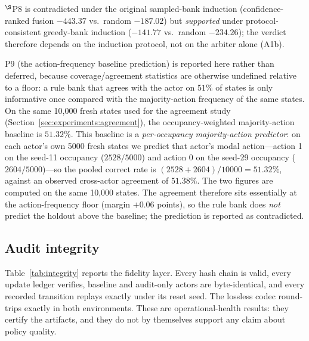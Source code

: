 \documentclass[11pt]{article}
\begin{document}
$^{\S}$P8 is contradicted under the original sampled-bank induction (confidence-ranked fusion $-443.37$
vs.\ random $-187.02$) but \emph{supported} under protocol-consistent greedy-bank induction ($-141.77$
vs.\ random $-234.26$); the verdict therefore depends on the induction protocol, not on the arbiter
alone (A1b).

P9 (the action-frequency baseline prediction) is reported here rather than deferred, because
coverage/agreement statistics are otherwise undefined relative to a floor: a rule bank that agrees
with the actor on $51\%$ of states is only informative once compared with the majority-action
frequency of the same states. On the same 10{,}000 fresh states used for the agreement study
(Section~\ref{sec:experiments:agreement}), the occupancy-weighted majority-action baseline is
$51.32\%$. This baseline is a \emph{per-occupancy majority-action predictor}: on each actor's own
5000 fresh states we predict that actor's modal action---action 1 on the seed-11 occupancy
($2528/5000$) and action 0 on the seed-29 occupancy ($2604/5000$)---so the pooled correct rate is
$(2528+2604)/10000 = 51.32\%$, against an observed cross-actor agreement of $51.38\%$. The two
figures are computed on the same 10{,}000 states. The agreement therefore sits
essentially at the action-frequency floor (margin $+0.06$ points), so the rule bank does \emph{not}
predict the holdout above the baseline; the prediction is reported as contradicted.

\subsection{Audit integrity}
\label{sec:experiments:integrity}

Table~\ref{tab:integrity} reports the fidelity layer. Every hash chain is valid, every update
ledger verifies, baseline and audit-only actors are byte-identical, and every recorded transition
replays exactly under its reset seed. The lossless codec round-trips exactly in both environments.
These are operational-health results: they certify the artifacts, and they do not by themselves
support any claim about policy quality.
\end{document}
